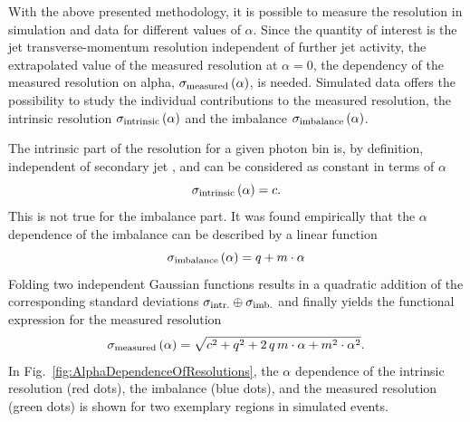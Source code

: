 With the above presented methodology, it is possible to measure the resolution in simulation and data for different values of $\alpha$.
Since the quantity of interest is the jet transverse-momentum resolution independent of further jet activity, \ie the extrapolated value of the measured resolution at $\alpha=0$, 
the dependency of the measured resolution on alpha, $\sigma_\mathrm{measured} \left( \alpha \right)$, is needed.
Simulated data offers the possibility to study the individual contributions to the measured resolution, the intrinsic resolution $\sigma_\mathrm{intrinsic}\left( \alpha \right)$ and the imbalance $\sigma_\mathrm{imbalance}\left( \alpha \right)$.%

The intrinsic part of the resolution for a given photon \pt bin is, by definition, independent of secondary jet \pt, and can be considered as constant in terms of $\alpha$
\begin{equation}\label{eq:intrinsic}
 \sigma_\mathrm{intrinsic} \left( \alpha\right) = c.
\end{equation}
This is not true for the imbalance part. 
It was found empirically that the $\alpha$ dependence of the imbalance can be described by a linear function~\cite{CMS:PAS:JETResolution_7TeV} 
\begin{equation}\label{eq:imbalance}
  \sigma_\mathrm{imbalance} \left( \alpha\right) = q + m \cdot \alpha
\end{equation}
Folding two independent Gaussian functions results in a quadratic addition of the corresponding standard deviations $\sigma_\mathrm{intr.}\oplus\sigma_\mathrm{imb.}$ and finally yields the functional expression for the measured resolution
\begin{equation}\label{eq:total}
  \sigma_\mathrm{measured} \left( \alpha \right) = \sqrt{ c^2 + q^2  + 2\, q\, m \cdot \alpha +m^2 \cdot \alpha^2}. 
\end{equation}
In Fig.~\ref{fig:AlphaDependenceOfResolutions}, the $\alpha$ dependence of the intrinsic resolution (red dots), the imbalance (blue dots), and the measured resolution (green dots) is shown for two exemplary \ptgamma regions in simulated events. 
